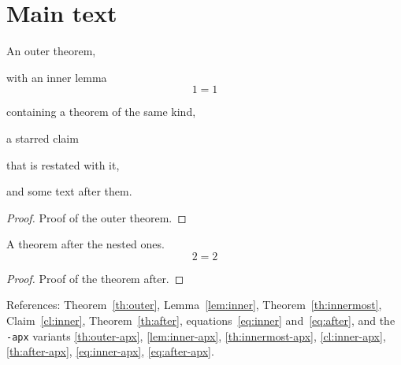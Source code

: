 \documentclass{article}
\begin{document}
\section{Main text}

\begin{theoremrep}[Outer]\label{th:outer}%
  An outer theorem,
  \begin{lemmarep}[Inner]\label{lem:inner}%
    with an inner lemma
    \begin{equation}\label{eq:inner}1=1\end{equation}
    \begin{theoremrep}\label{th:innermost}%
      containing a theorem of the same kind,
    \end{theoremrep}
  \end{lemmarep}
  a starred claim
  \begin{claimrep}\label{cl:inner}%
    that is restated with it,
  \end{claimrep}
  and some text after them.
\end{theoremrep}

\begin{proof}
  Proof of the outer theorem.
\end{proof}

\begin{theoremrep}\label{th:after}%
  A theorem after the nested ones.
  \begin{equation}\label{eq:after}2=2\end{equation}
\end{theoremrep}

\begin{proof}
  Proof of the theorem after.
\end{proof}

References: Theorem~\ref{th:outer}, Lemma~\ref{lem:inner},
Theorem~\ref{th:innermost}, Claim~\ref{cl:inner}, Theorem~\ref{th:after},
equations~\eqref{eq:inner} and~\eqref{eq:after}, and the \texttt{-apx}
variants \ref{th:outer-apx}, \ref{lem:inner-apx}, \ref{th:innermost-apx},
\ref{cl:inner-apx}, \ref{th:after-apx}, \eqref{eq:inner-apx},
\eqref{eq:after-apx}.
\end{document}

